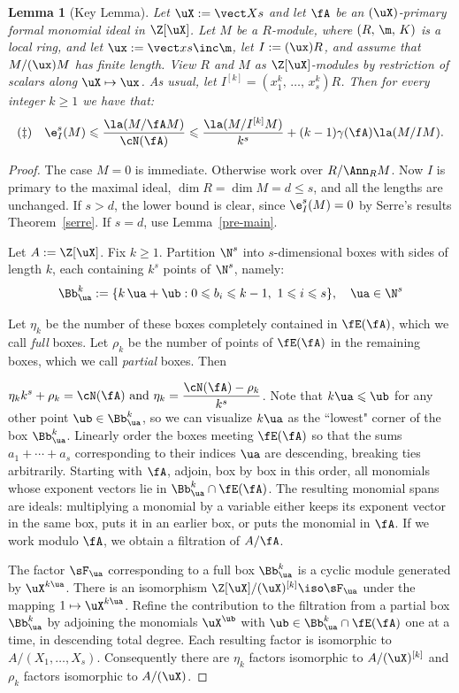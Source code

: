 \documentclass[12pt]{amsart}
\theoremstyle{plain}
\newtheorem{lemma}[theorem]{Lemma}
\theoremstyle{remark}
\theoremstyle{definition}
\numberwithin{equation}{theorem}
\renewcommand{\geq}{\geqslant} \renewcommand{\leq}{\leqslant}
\begin{document}
\begin{lemma}[Key Lemma]\label{key} Let $\uX :=\vect X s$ 
and let $\fA$ be an $(\uX)$-primary formal monomial ideal 
in $\Z[\uX]$. Let $M$ be a \fg $R$-module, where $(R,\, \m, \, K)$ is a local ring, and
let $\ux := \vect xs \inc \m$, let $I := (\ux)R$, and assume that $M/(\ux)M$ has finite length. View $R$ and $M$ as $\Z[\uX]$-modules by restriction of scalars along $\uX \mapsto \ux$.
As usual, let $I^{[k]} = (x_1^k, \, \ldots, \, x_s^k)R$.
Then for every integer $k \geq 1$ we have that: 
\[(\ddagger)\quad \e_I^s(M)\leq\frac{\la(M/\fA M)}{\cN(\fA)}
 \leq\frac{\la(M/I^{[k]} M)}{k^s} + (k-1)\gamma(\fA)\la(M/IM).\] 
\end{lemma} 

\begin{proof} 
The case $M=0$ is immediate. Otherwise work over
$R/\Ann_R M$. Now $I$ is primary to the maximal
ideal, $\dim R=\dim M=d\leq s$, and all the lengths are
unchanged. If $s>d$, the lower bound is clear,
since $\e_I^s(M)=0$ by Serre's results Theorem~\ref{serre}. 
If $s=d$, use Lemma~\ref{pre-main}.

Let $A :=\Z[\uX]$.  
Fix $k\geq1$.  Partition $\N^s$ 
into $s$-dimensional boxes with sides of length $k$, each  
containing $k^s$ points of $\N^s$, namely:
\[
\Bb^k_{\ua} := \{k\,\ua+\ub: 0 \leq b_i \leq k-1,\ 1 \leq i \leq s\},\quad \ua \in \N^s
\]

Let $\eta_k$ be the number of these boxes completely contained in $\fE(\fA)$, which we
call {\it full} boxes. Let $\rho_k$ be the number of  points of $\fE(\fA)$ in the 
remaining boxes, which we call {\it partial} boxes. Then 
\ben
\item $\displaystyle \eta_k k^s+\rho_k=\cN(\fA) 
\text{\ and\ } \eta_k = \frac{\cN(\fA) - \rho_k}{k^s}$. %
\een
Note that $k\ua \leq \ub$ for any other point $\ub \in \Bb_{\ua}^k$, so we can visualize 
$k\ua$ as the ``lowest" corner of the box $\Bb^k_{\ua}$. 
Linearly order the boxes meeting $\fE(\fA)$ so that the
sums $a_1 + \cdots + a_s$ corresponding to their indices
$\ua$ are descending, breaking ties arbitrarily. Starting with $\fA$,
adjoin, box by box in this order, all monomials whose exponent
vectors lie in $\Bb^k_{\ua}\cap\fE(\fA)$.
The resulting monomial spans are ideals: multiplying a monomial
by a variable either keeps its exponent vector in the same box,
puts it in an earlier box, or puts the monomial in $\fA$.
If we work modulo $\fA$, we obtain a filtration of $A/\fA$.

The factor $\sF_\ua$ corresponding to a full box 
$\Bb^k_{\ua}$ is a cyclic module generated by $\uX^{k\ua}$.
There is an isomorphism $\Z[\uX]/(\uX)^{[k]} \iso \sF_\ua$ under 
the mapping $1 \mapsto \uX^{k\ua}$. Refine the contribution to the filtration from a partial box $\Bb^k_{\ua}$ by adjoining the monomials $\uX^{\ub}$ with
$\ub\in\Bb^k_{\ua}\cap\fE(\fA)$ one at a time, in descending
total degree. Each resulting factor
is isomorphic to $A/(X_1,\ldots,X_s)$. Consequently there are 
$\eta_k$ factors isomorphic to $A/(\uX)^{[k]}$ and $\rho_k$ 
factors isomorphic to $A/(\uX)$.


\end{proof}
\end{document}
